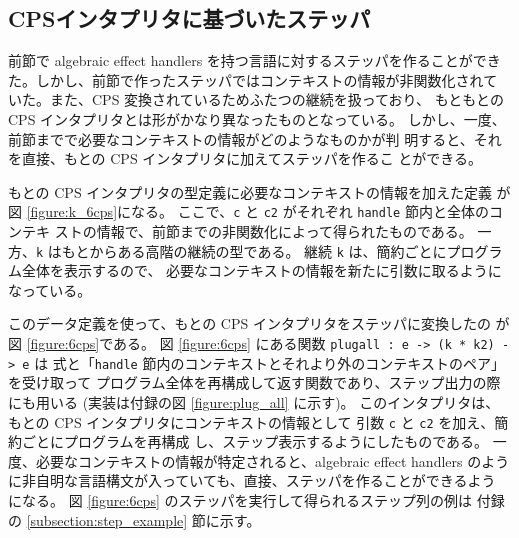 \subsection{CPSインタプリタに基づいたステッパ}

前節で algebraic effect handlers を持つ言語に対するステッパを作ることができ
た。しかし、前節で作ったステッパではコンテキストの情報が非関数化されて
いた。また、CPS 変換されているためふたつの継続を扱っており、
もともとの CPS インタプリタとは形がかなり異なったものとなっている。
しかし、一度、前節までで必要なコンテキストの情報がどのようなものかが判
明すると、それを直接、もとの CPS インタプリタに加えてステッパを作るこ
とができる。

もとの CPS インタプリタの型定義に必要なコンテキストの情報を加えた定義
が図 \ref{figure:k_6cps}になる。
ここで、\texttt{c} と \texttt{c2} がそれぞれ \texttt{handle} 節内と全体のコンテキ
ストの情報で、前節までの非関数化によって得られたものである。
一方、\texttt{k} はもとからある高階の継続の型である。
継続 \texttt{k} は、簡約ごとにプログラム全体を表示するので、
必要なコンテキストの情報を新たに引数に取るようになっている。

このデータ定義を使って、もとの CPS インタプリタをステッパに変換したの
が図 \ref{figure:6cps}である。
図 \ref{figure:6cps} にある関数 \texttt{plug\US{}all :\ e -> (k * k2) -> e} は
式と「\texttt{handle} 節内のコンテキストとそれより外のコンテキストのペア」を受け取って
プログラム全体を再構成して返す関数であり、ステップ出力の際にも用いる (実装は付録の図 \ref{figure:plug_all} に示す)。
このインタプリタは、もとの CPS インタプリタにコンテキストの情報として
引数 \texttt{c} と \texttt{c2} を加え、簡約ごとにプログラムを再構成
し、ステップ表示するようにしたものである。
一度、必要なコンテキストの情報が特定されると、algebraic effect handlers のよう
に非自明な言語構文が入っていても、直接、ステッパを作ることができるよう
になる。
図 \ref{figure:6cps} のステッパを実行して得られるステップ列の例は
付録の \ref{subsection:step_example} 節に示す。
